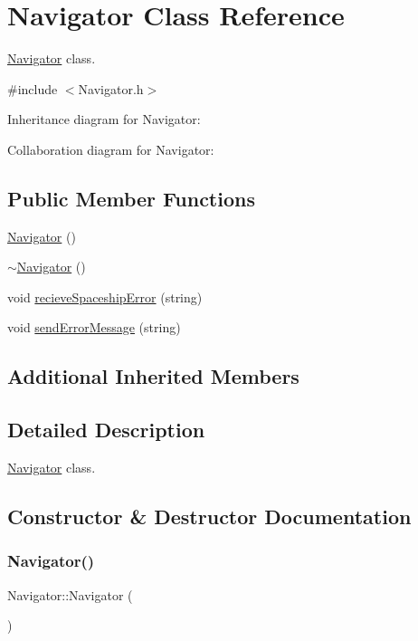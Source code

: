 \hypertarget{classNavigator}{}\section{Navigator Class Reference}
\label{classNavigator}


\hyperlink{classNavigator}{Navigator} class.  




{\ttfamily \#include $<$Navigator.\+h$>$}



Inheritance diagram for Navigator\+:


Collaboration diagram for Navigator\+:
\subsection*{Public Member Functions}
\begin{DoxyCompactItemize}
\item 
\hyperlink{classNavigator_a59230ab4698882f754d5ce275a1a4030}{Navigator} ()
\item 
\hyperlink{classNavigator_a81bb9c10588736497700032d8b61e9d1}{$\sim$\+Navigator} ()
\item 
void \hyperlink{classNavigator_a7dc06965001f658cff3c5f0dcac39def}{recieve\+Spaceship\+Error} (string)
\item 
void \hyperlink{classNavigator_a72ce12655f579879aae63b118c906b91}{send\+Error\+Message} (string)
\end{DoxyCompactItemize}
\subsection*{Additional Inherited Members}


\subsection{Detailed Description}
\hyperlink{classNavigator}{Navigator} class. 

\subsection{Constructor \& Destructor Documentation}
\mbox{\label{classNavigator_a59230ab4698882f754d5ce275a1a4030}} 
\subsubsection{\texorpdfstring{Navigator()}{Navigator()}}
{\footnotesize\ttfamily Navigator\+::\+Navigator (\begin{DoxyParamCaption}{ }\end{DoxyParamCaption})\hspace{0.3cm}{\ttfamily [inline]}}

